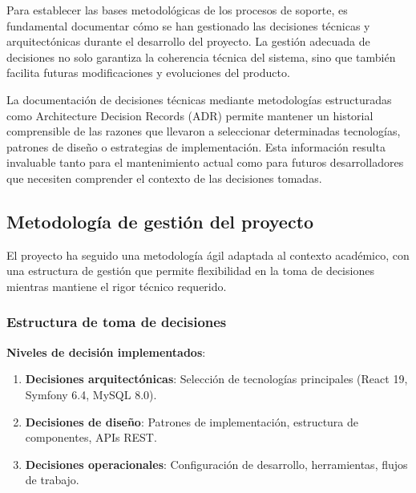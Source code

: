 \documentclass[12pt,a4paper,oneside]{report}
\providecommand{\tightlist}{%
  \setlength{\itemsep}{0pt}\setlength{\parskip}{0pt}}
\begin{document}
Para establecer las bases metodológicas de los procesos de soporte, es
fundamental documentar cómo se han gestionado las decisiones técnicas y
arquitectónicas durante el desarrollo del proyecto. La gestión adecuada
de decisiones no solo garantiza la coherencia técnica del sistema, sino
que también facilita futuras modificaciones y evoluciones del producto.

La documentación de decisiones técnicas mediante metodologías
estructuradas como Architecture Decision Records (ADR) permite mantener
un historial comprensible de las razones que llevaron a seleccionar
determinadas tecnologías, patrones de diseño o estrategias de
implementación. Esta información resulta invaluable tanto para el
mantenimiento actual como para futuros desarrolladores que necesiten
comprender el contexto de las decisiones tomadas.

\subsection{Metodología de gestión del
proyecto}\label{metodologuxeda-de-gestiuxf3n-del-proyecto}

El proyecto ha seguido una metodología ágil adaptada al contexto
académico, con una estructura de gestión que permite flexibilidad en la
toma de decisiones mientras mantiene el rigor técnico requerido.

\subsubsection{Estructura de toma de
decisiones}\label{estructura-de-toma-de-decisiones}

\textbf{Niveles de decisión implementados}:

\begin{enumerate}
\def\labelenumi{\arabic{enumi}.}
\tightlist
\item
  \textbf{Decisiones arquitectónicas}: Selección de tecnologías
  principales (React 19, Symfony 6.4, MySQL 8.0).
\item
  \textbf{Decisiones de diseño}: Patrones de implementación, estructura
  de componentes, APIs REST.
\item
  \textbf{Decisiones operacionales}: Configuración de desarrollo,
  herramientas, flujos de trabajo.
\end{enumerate}
\end{document}
